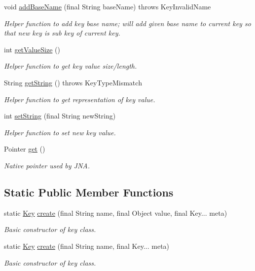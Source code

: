 \begin{DoxyCompactItemize}
void \mbox{\hyperlink{classorg_1_1libelektra_1_1Key_a07a939d44265c7b017104f3f37e9ca16}{add\+Base\+Name}} (final String base\+Name)  throws Key\+Invalid\+Name 	
\begin{DoxyCompactList}\small\item\em Helper function to add key base name; will add given base name to current key so that new key is sub key of current key. \end{DoxyCompactList}\item 
int \mbox{\hyperlink{classorg_1_1libelektra_1_1Key_aeb1c3e899a17778c8511a08ee0472e43}{get\+Value\+Size}} ()
\begin{DoxyCompactList}\small\item\em Helper function to get key value size/length. \end{DoxyCompactList}\item 
String \mbox{\hyperlink{classorg_1_1libelektra_1_1Key_a3464485c19d49b6763f6c831cf5ed06c}{get\+String}} ()  throws Key\+Type\+Mismatch 	
\begin{DoxyCompactList}\small\item\em Helper function to get representation of key value. \end{DoxyCompactList}\item 
int \mbox{\hyperlink{classorg_1_1libelektra_1_1Key_a5ccfaddf110c47c83686655a694ee76d}{set\+String}} (final String new\+String)
\begin{DoxyCompactList}\small\item\em Helper function to set new key value. \end{DoxyCompactList}\item 
Pointer \mbox{\hyperlink{classorg_1_1libelektra_1_1Key_a3c65267ac3d24c3eae35db576414fe4f}{get}} ()
\begin{DoxyCompactList}\small\item\em Native pointer used by J\+NA. \end{DoxyCompactList}\end{DoxyCompactItemize}
\subsection*{Static Public Member Functions}
\begin{DoxyCompactItemize}
\item 
static \mbox{\hyperlink{classorg_1_1libelektra_1_1Key}{Key}} \mbox{\hyperlink{classorg_1_1libelektra_1_1Key_a785f6b8e937d51575a4acc2ebc8f19a2}{create}} (final String name, final Object value, final Key... meta)
\begin{DoxyCompactList}\small\item\em Basic constructor of key class. \end{DoxyCompactList}\item 
static \mbox{\hyperlink{classorg_1_1libelektra_1_1Key}{Key}} \mbox{\hyperlink{classorg_1_1libelektra_1_1Key_a77ab77c48bcb237724581d914abbd7fe}{create}} (final String name, final Key... meta)
\begin{DoxyCompactList}\small\item\em Basic constructor of key class. \end{DoxyCompactList}\end{DoxyCompactItemize}
